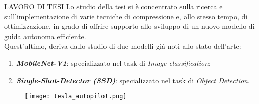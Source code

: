 \begin{frame}{LAVORO DI TESI}
    Lo studio della tesi si è concentrato sulla ricerca e sull'implementazione 
    di varie tecniche di compressione e, allo stesso tempo, di ottimizzazione, in grado di offrire supporto allo sviluppo di un nuovo modello di guida autonoma efficiente.\\
    \vspace{0.3cm}
    Quest'ultimo, deriva dallo studio di due modelli già noti allo stato dell'arte:
    \begin{minipage}{\linewidth}
        \centering
        \begin{minipage}{0.45\linewidth}
            \begin{enumerate}
                \item {\bfseries{\emph{MobileNet-V1}}}\footnotemark[1]: specializzato nel task di \emph{Image classification};
                \item {\bfseries{\emph{Single-Shot-Detector (SSD)}}}\footnotemark[2]: specializzato nel task di \emph{Object Detection}.
            \end{enumerate}
        \end{minipage}
        \begin{minipage}{0.45\linewidth}
            \begin{figure}
                \centering
                \texttt{[image: tesla\_autopilot.png]}
                \centering
            \end{figure}
        \end{minipage}
    \end{minipage}
\end{frame}